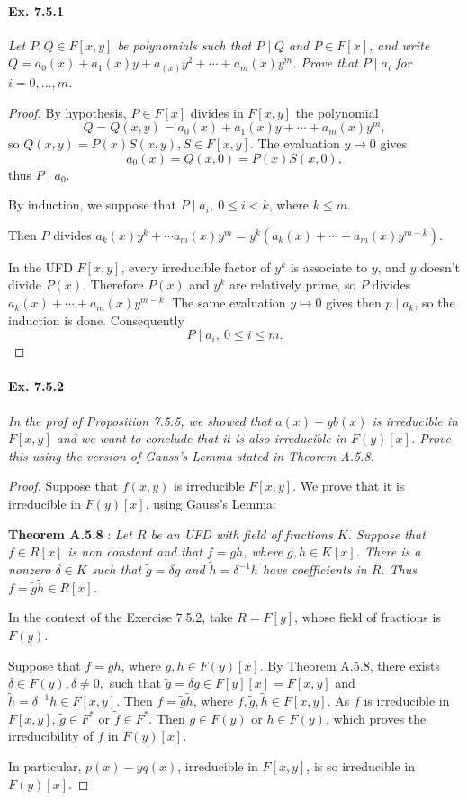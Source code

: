 \documentclass[11pt,a4paper]{article}
\begin{document}
\paragraph{Ex. 7.5.1}

{\it Let $P,Q \in F[x,y]$ be polynomials such that $P\mid Q$ and $P\in F[x]$, and write $Q= a_0(x)+a_1(x)y+a_(x)y^2+\cdots+a_m(x)y^m$. Prove that $P\mid a_i$ for $i=0,\ldots,m$.
}

\begin{proof}
By hypothesis, $P \in F[x]$ divides in $F[x,y]$ the polynomial 
$$Q = Q(x,y) = a_0(x)+a_1(x)y+\cdots+a_m(x)y^m,$$
so $Q(x,y) = P(x)S(x,y) , S \in F[x,y]$. The evaluation $y \mapsto 0$ gives 
$$a_0(x) = Q(x,0) = P(x)S(x,0),$$
thus $P \mid a_0$.

By induction, we suppose that $P \mid a_i, \ 0 \leq i < k$, where $k\leq m$.

Then $P$ divides $a_k(x)y^k+\cdots a_m(x)y^m = y^k(a_k(x)+ \cdots + a_m(x) y^{m-k})$.

In the UFD $F[x,y]$, every irreducible factor of $y^k$ is associate to $y$, and $y$ doesn't divide $P(x)$. Therefore $P(x)$ and $y^k$ are relatively prime, so $P$ divides $a_k(x)+ \cdots + a_m(x) y^{m-k}$. The same evaluation $y\mapsto 0$ gives then $p \mid a_k$, so the induction is done. Consequently
$$P \mid a_i,\  0 \leq i \leq m.$$
\end{proof}

\paragraph{Ex. 7.5.2} 

{\it In the prof of Proposition 7.5.5, we showed that $a(x) - yb(x)$ is irreducible in $F[x,y]$ and we want to conclude that it is also irreducible in $F(y)[x]$. Prove this using the version of Gauss's Lemma stated in Theorem A.5.8.
}

\begin{proof}
Suppose that $f(x,y) $ is irreducible $F[x,y]$.  We prove that it is irreducible in $F(y)[x]$, using Gauss's Lemma: 

{\bf Theorem A.5.8} :
{\it Let $R$ be an UFD with field of fractions $K$. Suppose that $f \in R[x]$ is non constant and that $f = gh$, where $g,h \in K[x]$. There is a nonzero $\delta \in K$ such that $\tilde{g} = \delta g$ and $\tilde{h} = \delta^{-1}h$ have coefficients in $R$. Thus $f = \tilde{g} \tilde{h} \in R[x]$.}

In the context of the Exercise 7.5.2, take $R = F[y]$, whose field of fractions is $F(y)$.

Suppose that $f = gh$, where $g,h \in F(y)[x]$. By Theorem A.5.8, there exists $\delta \in F(y),\delta \neq 0,$ such that $\tilde{g} = \delta g \in F[y][x] = F[x,y]$ and $\tilde{h} = \delta^{-1} h \in F[x,y]$. Then $f = \tilde{g} \tilde{h}$, where $f, \tilde{g},\tilde{h} \in F[x,y]$. As $f$ is irreducible in $F[x,y]$, $\tilde{g} \in F^*$ or $\tilde{f} \in F^*$. Then $g \in F(y)$ or $h\in F(y)$, which proves the irreducibility of $f$ in $F(y)[x]$.

In particular, $p(x) - y q(x)$, irreducible in $F[x,y]$, is so irreducible in $F(y)[x]$.
\end{proof}
\end{document}
